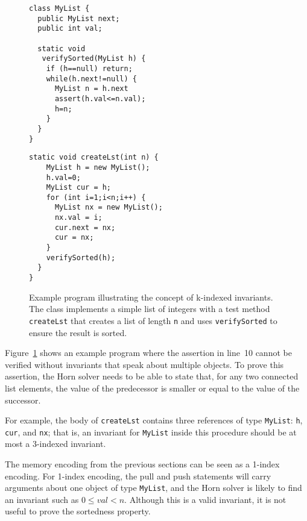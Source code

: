\begin{figure}[ht]
\lstset{language=Java,
numbers=left}
\centering
\begin{minipage}{.95\textwidth}
\centering
\begin{minipage}{.48\textwidth}
\begin{lstlisting}
class MyList {
  public MyList next;
  public int val;

  static void 
   verifySorted(MyList h) {
    if (h==null) return;
    while(h.next!=null) {
      MyList n = h.next
      assert(h.val<=n.val);
      h=n;
    }
  }
}
\end{lstlisting}
\end{minipage}
\begin{minipage}{.49\textwidth}
\begin{lstlisting}[firstnumber=15]
  static void createLst(int n) {
    MyList h = new MyList();
    h.val=0;
    MyList cur = h;
    for (int i=1;i<n;i++) {
      MyList nx = new MyList();
      nx.val = i;
      cur.next = nx;
      cur = nx;
    }
    verifySorted(h);
  }
}
\end{lstlisting}
\end{minipage}
\end{minipage}
\caption{Example program illustrating the concept of k-indexed invariants. The
class implements a simple list of integers with a test method \texttt{createLst}
that creates a list of length \texttt{n} and uses \texttt{verifySorted}
to ensure the result is sorted.}
\label{fig-sorted}

\lstset{language=Java,
numbers=none}
\end{figure}

Figure~\ref{fig-sorted} shows an example program where the assertion in line~10
cannot be verified without invariants that speak about multiple objects. To prove
this assertion, the Horn solver needs to be able to state that, for any two connected
list elements, the value of the predecessor is smaller or equal to the value of the 
successor.

For example, the body of \texttt{createLst} contains three references of type \texttt{MyList}: 
\texttt{h}, \texttt{cur}, and \texttt{nx}; that is, an invariant for 
\texttt{MyList} inside this procedure should be at most a 3-indexed invariant.

The memory encoding from the previous sections can be
seen as a 1-index encoding. For 1-index encoding, the pull and push statements 
will carry arguments about one object of type \texttt{MyList}, and the Horn
solver is likely to find an invariant such as $0\leq val < n$. Although this is a valid
invariant, it is not useful to prove the sortedness property.

